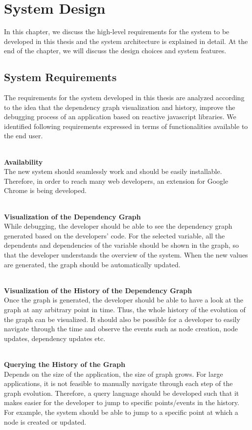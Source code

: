 \chapter{System Design} \label{chap:System Design}
In this chapter, we discuss the high-level requirements for the system to be developed in this thesis and the system architecture is explained in detail. 
At the end of the chapter, we will discuss the design choices and system features.

\section{System Requirements}
The requirements for the system developed in this thesis are analyzed according to the idea that the dependency graph visualization and history, improve the debugging process of an application based on reactive javascript libraries. We identified following requirements expressed in terms of functionalities available to the end user.

\leavevmode
\\
\textbf{Availability}
\\
The new system should seamlessly work and should be easily installable. Therefore, in order to reach many web developers, an extension for Google Chrome is being developed. 

\leavevmode
\\
\textbf{Visualization of the Dependency Graph}
\\
While debugging, the developer should be able to see the dependency graph generated based on the developers' code. For the selected variable, all the dependents and dependencies of the variable should be shown in the graph, so that the developer understands the overview of the system. 
When the new values are generated, the graph should be automatically updated.

\leavevmode
\\
\textbf{Visualization of the History of the Dependency Graph}
\\
Once the graph is generated, the developer should be able to have a look at the graph at any arbitrary point in time. Thus, the whole history of the evolution of the graph can be visualized. It should also be possible for a developer to easily navigate through the time and observe the events such as node creation, node updates, dependency updates etc.

\leavevmode
\\
\textbf{Querying the History of the Graph}
\\
Depends on the size of the application, the size of graph grows. For large applications, it is not feasible to manually navigate through each step of the graph evolution. Therefore, a query language should be developed such that it makes easier for the developer to jump to specific points/events in the history. For example, the system should be able to jump to a specific point at which a node is created or updated.

